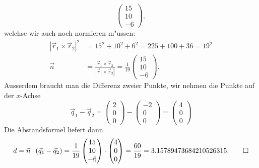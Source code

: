 \begin{loesung}
\[\begin{pmatrix}
15\\10\\ -6
\end{pmatrix},
\]
welchse wir auch noch normieren m"ussen:
\begin{align*}
|\vec r_1\times\vec r_2|^2
&=15^2+10^2+6^2=225+100+36=19^2
\\
\vec n&=
\frac{\vec r_1\times\vec r_2}{|\vec r_1\times\vec r_2|}=
\frac1{19}
\begin{pmatrix}
15\\10\\ -6
\end{pmatrix}.
\end{align*}
Ausserdem braucht man die Differenz zweier Punkte,
wir nehmen die Punkte auf der $x$-Achse
\[
\vec q_1-\vec q_2
=
\begin{pmatrix}2\\0\\0\end{pmatrix}
-
\begin{pmatrix}-2\\0\\0\end{pmatrix}
=
\begin{pmatrix}4\\0\\0\end{pmatrix}
\]
Die Abstandsformel liefert dann
\[
d=\vec n\cdot (\vec q_1-\vec q_2)=
\frac1{19}
\begin{pmatrix}
15\\10\\ -6
\end{pmatrix}
\cdot
\begin{pmatrix}4\\0\\0\end{pmatrix}
=\frac{60}{19}
=
3.15789473684210526315.
\qedhere
\]
\end{loesung}

